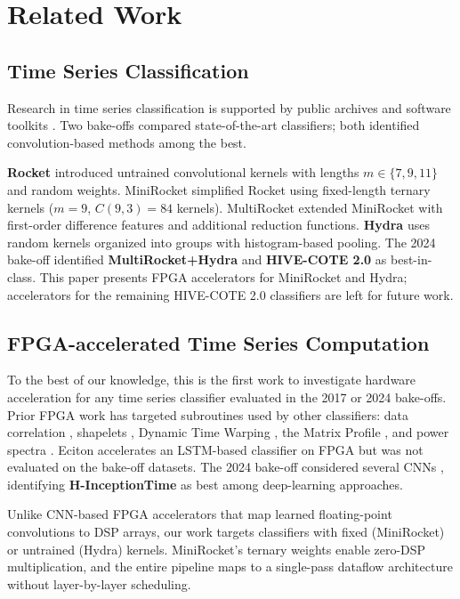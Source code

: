 \section{Related Work}
\label{sec:Related}

\subsection{Time Series Classification}
\label{sec:TSC}

Research in time series classification is supported by public archives \cite{UCRTimeSeries, UEATimeSeries, MONSTER} and software toolkits \cite{sktime, pyts, tslearn, aeon-arxiv, aeon-pkdd}. Two bake-offs \cite{BakeOff, BakeOffRedux, BakeOffReduxCorrection} compared state-of-the-art classifiers; both identified convolution-based methods among the best.

\textbf{Rocket} \cite{Rocket} introduced untrained convolutional kernels with lengths $m \in \{7, 9, 11\}$ and random weights. MiniRocket \cite{MiniRocket} simplified Rocket using fixed-length ternary kernels ($m = 9$, $C(9,3)=84$ kernels). MultiRocket \cite{MultiRocket} extended MiniRocket with first-order difference features and additional reduction functions. \textbf{Hydra} \cite{Hydra} uses random kernels organized into groups with histogram-based pooling. The 2024 bake-off identified \textbf{MultiRocket+Hydra} and \textbf{HIVE-COTE 2.0} \cite{HIVE-COTE2.0} as best-in-class. This paper presents FPGA accelerators for MiniRocket and Hydra; accelerators for the remaining HIVE-COTE 2.0 classifiers are left for future work.

\subsection{FPGA-accelerated Time Series Computation}
\label{sec:fpga_time_series}

To the best of our knowledge, this is the first work to investigate hardware acceleration for any time series classifier evaluated in the 2017 or 2024 bake-offs. Prior FPGA work has targeted subroutines used by other classifiers: data correlation \cite{ChiosaAMNES}, shapelets \cite{CostaShapelet, LiuShapelet}, Dynamic Time Warping \cite{SartDTW, WangDTW}, the Matrix Profile \cite{RomeroMP, KalantarLAMP}, and power spectra \cite{SpectralAnomalyDetection}. Eciton \cite{Eciton} accelerates an LSTM-based classifier on FPGA but was not evaluated on the bake-off datasets. The 2024 bake-off considered several CNNs \cite{InceptionTime, H-InceptionTime, LiteTime}, identifying \textbf{H-InceptionTime} \cite{H-InceptionTime} as best among deep-learning approaches.

Unlike CNN-based FPGA accelerators that map learned floating-point convolutions to DSP arrays, our work targets classifiers with fixed (MiniRocket) or untrained (Hydra) kernels. MiniRocket's ternary weights enable zero-DSP multiplication, and the entire pipeline maps to a single-pass dataflow architecture without layer-by-layer scheduling.